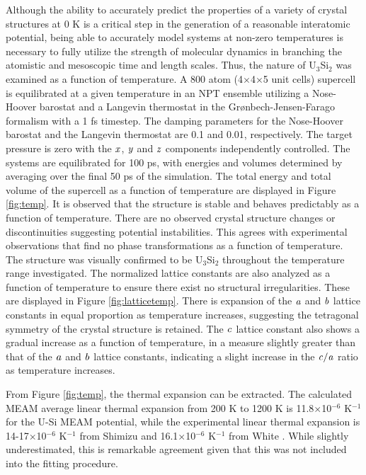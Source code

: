 \documentclass[review]{elsarticle}
\begin{document}
\FloatBarrier

Although the ability to accurately predict the properties of a variety of crystal structures at 0 K is a critical step in the generation of a reasonable interatomic potential, being able to accurately model systems at non-zero temperatures is necessary to fully utilize the strength of molecular dynamics in branching the atomistic and mesoscopic time and length scales.  Thus, the nature of U$_{3}$Si$_{2}$ was examined as a function of temperature.  A 800 atom (4$\times$4$\times$5 unit cells) supercell is equilibrated at a given temperature in an NPT ensemble utilizing a Nose-Hoover barostat and a Langevin thermostat in the Gr{\o}nbech-Jensen-Farago \cite{gjf2013} formalism with a 1 fs timestep.  The damping parameters for the Nose-Hoover barostat and the Langevin thermostat are 0.1 and 0.01, respectively.  The target pressure is zero with the $\it{x}$, $\it{y}$ and $\it{z}$ components independently controlled. The systems are equilibrated for 100 ps, with energies and volumes determined by averaging over the final 50 ps of the simulation.  The total energy and total volume of the supercell as a function of temperature are displayed in Figure \ref{fig:temp}.  It is observed that the structure is stable and behaves predictably as a function of temperature.   There are no observed crystal structure changes or discontinuities suggesting potential instabilities.  This agrees with experimental observations that find no phase transformations as a function of temperature.  The structure was visually confirmed to be U$_{3}$Si$_{2}$ throughout the temperature range investigated.  The normalized lattice constants are also analyzed as a function of temperature to ensure there exist no structural irregularities.  These are displayed in Figure \ref{fig:latticetemp}.  There is expansion of the $\it{a}$ and $\it{b}$ lattice constants in equal proportion as temperature increases, suggesting the tetragonal symmetry of the crystal structure is retained.  The $\it{c}$ lattice constant also shows a gradual increase as a function of temperature, in a measure slightly greater than that of the $\it{a}$ and $\it{b}$ lattice constants, indicating a slight increase in the $\it{c/a}$ ratio as temperature increases.  

From Figure \ref{fig:temp}, the thermal expansion can be extracted.  The calculated MEAM average linear thermal expansion from 200 K to 1200 K is 11.8$\times$10$^{-6}$ K$^{-1}$ for the U-Si MEAM potential, while the experimental linear thermal expansion is 14-17$\times$10$^{-6}$ K$^{-1}$ from Shimizu \cite{shimizu1965} and 16.1$\times$10$^{-6}$ K$^{-1}$ from White \cite{white2015}.  While slightly underestimated, this is remarkable agreement given that this was not included into the fitting procedure.  
\end{document}
